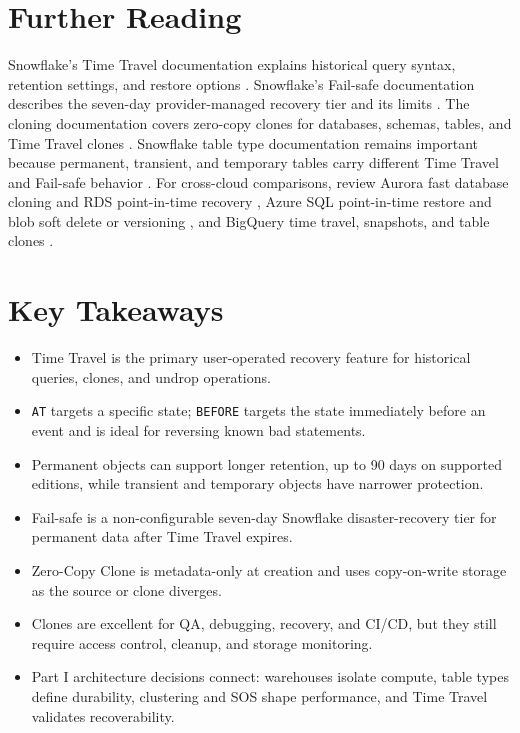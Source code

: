 \section{Further Reading}
Snowflake's Time Travel documentation explains historical query syntax, retention settings, and restore options \cite{snowflakeTimeTravelDocs}. Snowflake's Fail-safe documentation describes the seven-day provider-managed recovery tier and its limits \cite{snowflakeFailSafeDocs}. The cloning documentation covers zero-copy clones for databases, schemas, tables, and Time Travel clones \cite{snowflakeCloneDocs}. Snowflake table type documentation remains important because permanent, transient, and temporary tables carry different Time Travel and Fail-safe behavior \cite{snowflakeTableTypesDocs}. For cross-cloud comparisons, review Aurora fast database cloning and RDS point-in-time recovery \cite{awsAuroraCloneDocs,awsRdsPitrDocs}, Azure SQL point-in-time restore and blob soft delete or versioning \cite{azureSqlPitrDocs,azureBlobSoftDeleteDocs}, and BigQuery time travel, snapshots, and table clones \cite{googleBigQueryTimeTravelDocs,googleBigQueryTableSnapshotsDocs,googleBigQueryTableClonesDocs}.
\section*{Key Takeaways}
\begin{itemize}
    \item Time Travel is the primary user-operated recovery feature for historical queries, clones, and undrop operations.
    \item \texttt{AT} targets a specific state; \texttt{BEFORE} targets the state immediately before an event and is ideal for reversing known bad statements.
    \item Permanent objects can support longer retention, up to 90 days on supported editions, while transient and temporary objects have narrower protection.
    \item Fail-safe is a non-configurable seven-day Snowflake disaster-recovery tier for permanent data after Time Travel expires.
    \item Zero-Copy Clone is metadata-only at creation and uses copy-on-write storage as the source or clone diverges.
    \item Clones are excellent for QA, debugging, recovery, and CI/CD, but they still require access control, cleanup, and storage monitoring.
    \item Part I architecture decisions connect: warehouses isolate compute, table types define durability, clustering and SOS shape performance, and Time Travel validates recoverability.
\end{itemize}
